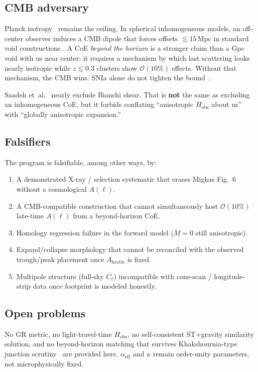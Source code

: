 \documentclass[11pt,a4paper]{article}
\begin{document}
\subsection{CMB adversary}
Planck isotropy~\citep{Planck2018VII} remains the ceiling. In spherical
inhomogeneous models, an off-center observer induces a CMB dipole that forces
offsets $\lesssim 15\,\mathrm{Mpc}$ in standard void constructions
\citep{Alnes2006,Kodama2010}. A CoE \emph{beyond the horizon} is a stronger
claim than a Gpc void with us near center: it requires a mechanism by which last
scattering looks nearly isotropic while $z\lesssim0.3$ clusters show
$\mathcal{O}(10\%)$ effects. Without that mechanism, the CMB wins. SNIa alone
do not tighten the bound~\citep{Blomqvist2010}.

Saadeh et~al.~\citep{Saadeh2016} nearly exclude Bianchi shear. That is
\textbf{not} the same as excluding an inhomogeneous CoE, but it forbids
conflating ``anisotropic $H_{\mathrm{obs}}$ about us'' with ``globally
anisotropic expansion.''

\subsection{Falsifiers}
The program is falsifiable, among other ways, by:
\begin{enumerate}[leftmargin=*,itemsep=2pt]
\item A demonstrated X-ray / selection systematic that erases Migkas Fig.~6
  without a cosmological $A(\ell)$.
\item A CMB-compatible construction that cannot simultaneously host
  $\mathcal{O}(10\%)$ late-time $A(\ell)$ from a beyond-horizon CoE.
\item Homology regression failure in the forward model ($M=0$ still anisotropic).
\item Expand/collapse morphology that cannot be reconciled with the observed
  trough/peak placement once $A_{\mathrm{hratio}}$ is fixed.
\item Multipole structure (full-sky $C_\ell$) incompatible with cone-scan /
  longitude-strip data once footprint is modeled honestly.
\end{enumerate}

\subsection{Open problems}
No GR metric, no light-travel-time $H_{\mathrm{obs}}$, no self-consistent
ST+gravity similarity solution, and no beyond-horizon matching that survives
Khakshournia-type junction scrutiny~\citep{Khakshournia2014} are provided here.
$\alpha_{\mathrm{eff}}$ and $\kappa$ remain order-unity parameters, not
microphysically fixed.
\end{document}
